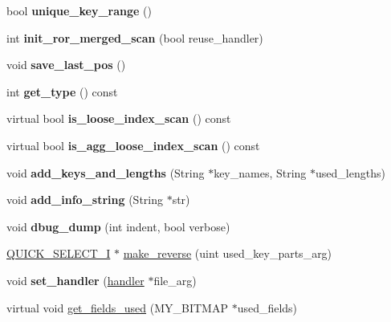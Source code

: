 \begin{DoxyCompactItemize}
bool {\bfseries unique\+\_\+key\+\_\+range} ()
\item 
\mbox{\label{classQUICK__RANGE__SELECT_afa619c276d414e3c20cab5336014a06c}} 
int {\bfseries init\+\_\+ror\+\_\+merged\+\_\+scan} (bool reuse\+\_\+handler)
\item 
\mbox{\label{classQUICK__RANGE__SELECT_a1b45df330092941ed6ca2f3cf423afdf}} 
void {\bfseries save\+\_\+last\+\_\+pos} ()
\item 
\mbox{\label{classQUICK__RANGE__SELECT_a7978ff2e1f26507feb784785a50c24d3}} 
int {\bfseries get\+\_\+type} () const
\item 
\mbox{\label{classQUICK__RANGE__SELECT_a666d1fe9a1ee41004ec67990889b3dca}} 
virtual bool {\bfseries is\+\_\+loose\+\_\+index\+\_\+scan} () const
\item 
\mbox{\label{classQUICK__RANGE__SELECT_a9a4ed8b7e215d672d14f0c35d9cdd58a}} 
virtual bool {\bfseries is\+\_\+agg\+\_\+loose\+\_\+index\+\_\+scan} () const
\item 
\mbox{\label{classQUICK__RANGE__SELECT_a3f3acfd700d13734fb21b1decd65a20a}} 
void {\bfseries add\+\_\+keys\+\_\+and\+\_\+lengths} (String $\ast$key\+\_\+names, String $\ast$used\+\_\+lengths)
\item 
\mbox{\label{classQUICK__RANGE__SELECT_aaac439d03cd6beb04fddd3630d023e36}} 
void {\bfseries add\+\_\+info\+\_\+string} (String $\ast$str)
\item 
\mbox{\label{classQUICK__RANGE__SELECT_ac64689c27506b51bd973af9364eaa87b}} 
void {\bfseries dbug\+\_\+dump} (int indent, bool verbose)
\item 
\mbox{\hyperlink{classQUICK__SELECT__I}{Q\+U\+I\+C\+K\+\_\+\+S\+E\+L\+E\+C\+T\+\_\+I}} $\ast$ \mbox{\hyperlink{classQUICK__RANGE__SELECT_a280387b7e06179c666ae990bee3c9894}{make\+\_\+reverse}} (uint used\+\_\+key\+\_\+parts\+\_\+arg)
\item 
\mbox{\label{classQUICK__RANGE__SELECT_a3f691b4907404bb2dfa35f2529847296}} 
void {\bfseries set\+\_\+handler} (\mbox{\hyperlink{classhandler}{handler}} $\ast$file\+\_\+arg)
\item 
virtual void \mbox{\hyperlink{classQUICK__RANGE__SELECT_a82d2dca80080416c5c9b7269d64111e5}{get\+\_\+fields\+\_\+used}} (M\+Y\+\_\+\+B\+I\+T\+M\+AP $\ast$used\+\_\+fields)
\end{DoxyCompactItemize}
